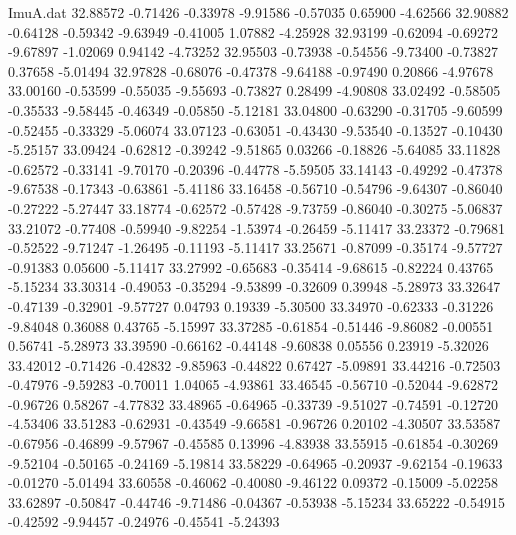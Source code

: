 \begin{filecontents}{ImuA.dat}
  32.88572   -0.71426   -0.33978   -9.91586   -0.57035    0.65900   -4.62566
  32.90882   -0.64128   -0.59342   -9.63949   -0.41005    1.07882   -4.25928
  32.93199   -0.62094   -0.69272   -9.67897   -1.02069    0.94142   -4.73252
  32.95503   -0.73938   -0.54556   -9.73400   -0.73827    0.37658   -5.01494
  32.97828   -0.68076   -0.47378   -9.64188   -0.97490    0.20866   -4.97678
  33.00160   -0.53599   -0.55035   -9.55693   -0.73827    0.28499   -4.90808
  33.02492   -0.58505   -0.35533   -9.58445   -0.46349   -0.05850   -5.12181
  33.04800   -0.63290   -0.31705   -9.60599   -0.52455   -0.33329   -5.06074
  33.07123   -0.63051   -0.43430   -9.53540   -0.13527   -0.10430   -5.25157
  33.09424   -0.62812   -0.39242   -9.51865    0.03266   -0.18826   -5.64085
  33.11828   -0.62572   -0.33141   -9.70170   -0.20396   -0.44778   -5.59505
  33.14143   -0.49292   -0.47378   -9.67538   -0.17343   -0.63861   -5.41186
  33.16458   -0.56710   -0.54796   -9.64307   -0.86040   -0.27222   -5.27447
  33.18774   -0.62572   -0.57428   -9.73759   -0.86040   -0.30275   -5.06837
  33.21072   -0.77408   -0.59940   -9.82254   -1.53974   -0.26459   -5.11417
  33.23372   -0.79681   -0.52522   -9.71247   -1.26495   -0.11193   -5.11417
  33.25671   -0.87099   -0.35174   -9.57727   -0.91383    0.05600   -5.11417
  33.27992   -0.65683   -0.35414   -9.68615   -0.82224    0.43765   -5.15234
  33.30314   -0.49053   -0.35294   -9.53899   -0.32609    0.39948   -5.28973
  33.32647   -0.47139   -0.32901   -9.57727    0.04793    0.19339   -5.30500
  33.34970   -0.62333   -0.31226   -9.84048    0.36088    0.43765   -5.15997
  33.37285   -0.61854   -0.51446   -9.86082   -0.00551    0.56741   -5.28973
  33.39590   -0.66162   -0.44148   -9.60838    0.05556    0.23919   -5.32026
  33.42012   -0.71426   -0.42832   -9.85963   -0.44822    0.67427   -5.09891
  33.44216   -0.72503   -0.47976   -9.59283   -0.70011    1.04065   -4.93861
  33.46545   -0.56710   -0.52044   -9.62872   -0.96726    0.58267   -4.77832
  33.48965   -0.64965   -0.33739   -9.51027   -0.74591   -0.12720   -4.53406
  33.51283   -0.62931   -0.43549   -9.66581   -0.96726    0.20102   -4.30507
  33.53587   -0.67956   -0.46899   -9.57967   -0.45585    0.13996   -4.83938
  33.55915   -0.61854   -0.30269   -9.52104   -0.50165   -0.24169   -5.19814
  33.58229   -0.64965   -0.20937   -9.62154   -0.19633   -0.01270   -5.01494
  33.60558   -0.46062   -0.40080   -9.46122    0.09372   -0.15009   -5.02258
  33.62897   -0.50847   -0.44746   -9.71486   -0.04367   -0.53938   -5.15234
  33.65222   -0.54915   -0.42592   -9.94457   -0.24976   -0.45541   -5.24393

\end{filecontents}
